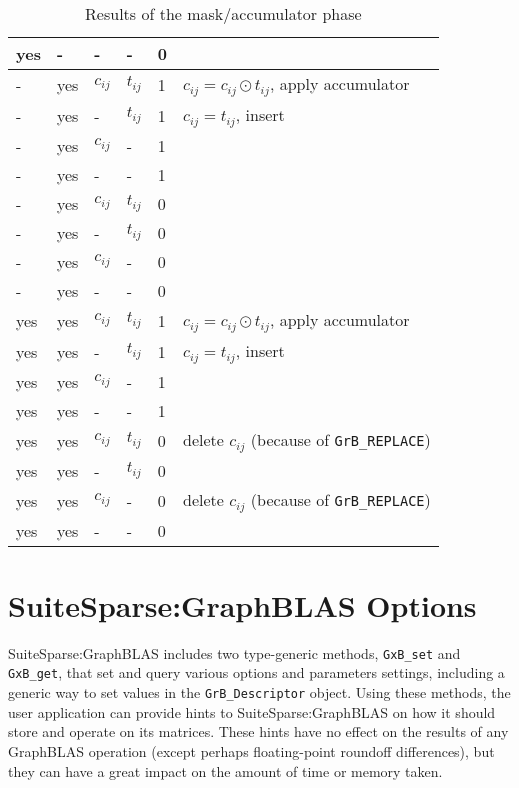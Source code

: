 \documentclass[12pt]{article}
\begin{document}
\begin{table}
{\begin{tabular}{lllll|l}
    yes&-   &  -       &  -        & 0    &   \\
\hline
    -  &yes & $c_{ij}$ & $t_{ij}$  & 1    &  $c_{ij} = c_{ij} \odot t_{ij}$, apply accumulator \\
    -  &yes &  -       & $t_{ij}$  & 1    &  $c_{ij} = t_{ij}$, insert \\
    -  &yes & $c_{ij}$ &  -        & 1    &   \\
    -  &yes &  -       &  -        & 1    &   \\
    -  &yes & $c_{ij}$ & $t_{ij}$  & 0    &   \\
    -  &yes &  -       & $t_{ij}$  & 0    &   \\
    -  &yes & $c_{ij}$ &  -        & 0    &   \\
    -  &yes &  -       &  -        & 0    &   \\
\hline
    yes&yes & $c_{ij}$ & $t_{ij}$  & 1    &  $c_{ij} = c_{ij} \odot t_{ij}$, apply accumulator \\
    yes&yes &  -       & $t_{ij}$  & 1    &  $c_{ij} = t_{ij}$, insert \\
    yes&yes & $c_{ij}$ &  -        & 1    &   \\
    yes&yes &  -       &  -        & 1    &   \\
    yes&yes & $c_{ij}$ & $t_{ij}$  & 0    &  delete $c_{ij}$  (because of \verb'GrB_REPLACE') \\
    yes&yes &  -       & $t_{ij}$  & 0    &   \\
    yes&yes & $c_{ij}$ &  -        & 0    &  delete $c_{ij}$  (because of \verb'GrB_REPLACE') \\
    yes&yes &  -       &  -        & 0    &   \\
\hline
\end{tabular}
}
\caption{Results of the mask/accumulator phase \label{tab:maskaccum}}
\end{table}


\newpage
\section{SuiteSparse:GraphBLAS Options} %
\label{options}

SuiteSparse:GraphBLAS includes two type-generic methods, \verb'GxB_set' and
\verb'GxB_get', that set and query various options and parameters settings,
including a generic way to set values in the \verb'GrB_Descriptor' object.
Using these methods, the user application can provide hints to
SuiteSparse:GraphBLAS on how it should store and operate on its matrices.
These hints have no effect on the results of any GraphBLAS operation (except
perhaps floating-point roundoff differences), but they can have a great impact
on the amount of time or memory taken.
\end{document}
